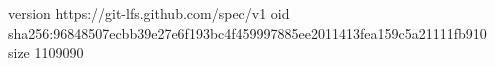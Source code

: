 version https://git-lfs.github.com/spec/v1
oid sha256:96848507ecbb39e27e6f193bc4f459997885ee2011413fea159c5a21111fb910
size 1109090
